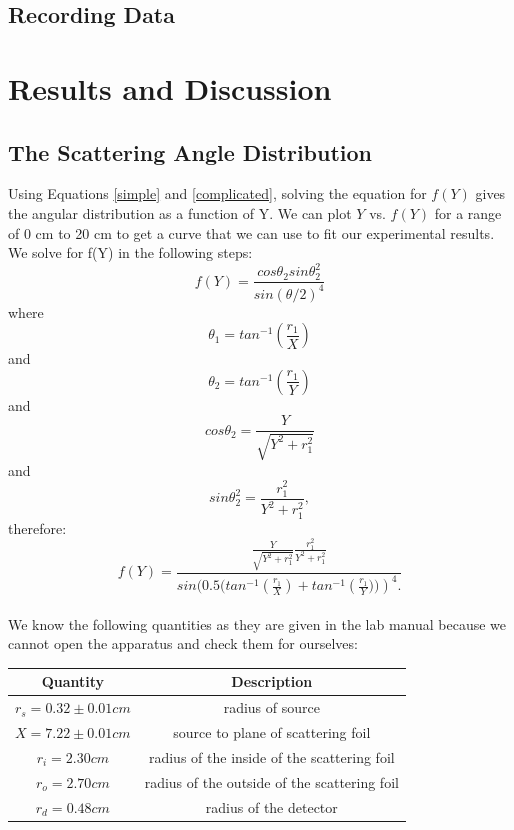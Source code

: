 \subsection{Recording Data}

\section{Results and Discussion}
\subsection{The Scattering Angle Distribution}
Using Equations \ref{simple} and \ref{complicated}, solving the equation for $f(Y)$ gives the angular distribution as a function of Y. We can plot $Y$ vs. $f(Y)$ for a range of 0 cm to 20 cm to get a curve that we can use to fit our experimental results. We solve for f(Y) in the following steps:
\begin{equation} f(Y)=\frac{cos\theta_2 sin\theta_2^2}{sin(\theta/2)^4} \end{equation} where
\begin{equation} \theta_1=tan^{-1}\left(\frac{r_1}{X}\right)\end{equation} and
\begin{equation} \theta_2=tan^{-1}\left(\frac{r_1}{Y}\right)\end{equation} and
\begin{equation} cos\theta_2=\frac{Y}{\sqrt{Y^2+r_1^2}} \end{equation} and
\begin{equation} sin\theta_2^2=\frac{r_1^2}{Y^2+r_1^2}, \end{equation} therefore:
\begin{equation} f(Y)= \frac{\frac{Y}{\sqrt{Y^2+r_1^2}} \frac{r_1^2}{Y^2+r_1^2}}{sin(0.5(tan^{-1}\left(\frac{r_1}{X}\right) + tan^{-1}\left(\frac{r_1}{Y}))\right)^4.} \end{equation}\\
We know the following quantities as they are given in the lab manual because we cannot open the apparatus and check them for ourselves:
\begin{table}
\begin{center}
\begin{tabular}{|c|c|}\hline
Quantity & Description \\ \hline 
$r_s=0.32\pm0.01cm$ & radius of source\\ \hline 
$X=7.22\pm0.01cm$ & source to plane of scattering foil\\ \hline
$r_i=2.30cm$ & radius of the inside of the scattering foil\\ \hline
$r_o=2.70cm$ & radius of the outside of the scattering foil\\ \hline
$r_d=0.48cm$ & radius of the detector\\ \hline
\end{tabular}
\end{center}
\end{table}
